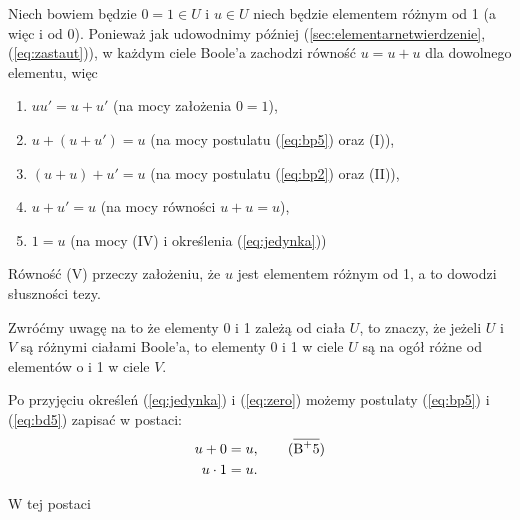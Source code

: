 \documentclass[12 pt, a4paper, leqno]{book}
\numberwithin{equation}{section}
\newcommand{\refb}[1]{(\ref{#1})}
\begin{document}
 Niech bowiem będzie $0 = 1 \in U$ i $u \in U$ niech będzie elementem różnym od 1 (a więc i od 0).
 Ponieważ jak udowodnimy później (\ref{sec:elementarnetwierdzenie}, \refb{eq:zastaut}), w każdym ciele 
 Boole'a zachodzi równość $u=u+u$ dla dowolnego elementu, więc
\begin{enumerate}[label=(\Roman*), labelsep=2em]
  \item $uu' = u + u'$ (na mocy założenia $0=1$), 
  \item $u+(u+u')=u$ (na mocy postulatu \refb{eq:bp5} oraz (\RN{1})),
  \item $(u+u)+u'=u$ (na mocy postulatu \refb{eq:bp2} oraz (\RN{2})),
  \item $u+u'=u$ (na mocy równości $u+u=u$),
  \item $1=u$ (na mocy (\RN{4}) i określenia \refb{eq:jedynka})
\end{enumerate}

Równość (\RN{5}) przeczy założeniu, że $u$ jest elementem różnym od 1, a to dowodzi słuszności tezy.

Zwróćmy uwagę na to że elementy 0 i 1 zależą od ciała $U$, to znaczy, że jeżeli $U$ i $V$ są różnymi ciałami
Boole'a, to elementy 0 i 1 w ciele $U$ są na ogół różne od elementów o i 1 w ciele $V$.

Po przyjęciu określeń \refb{eq:jedynka} i \refb{eq:zero} możemy postulaty \refb{eq:bp5} i
\refb{eq:bd5} zapisać w postaci:
\begin{align*}
u+0 &= u,\tag{$\overline{\mbox{B}^+5}$} \\
u \cdot 1 &= u.
\end{align*}

W tej postaci
\end{document}
